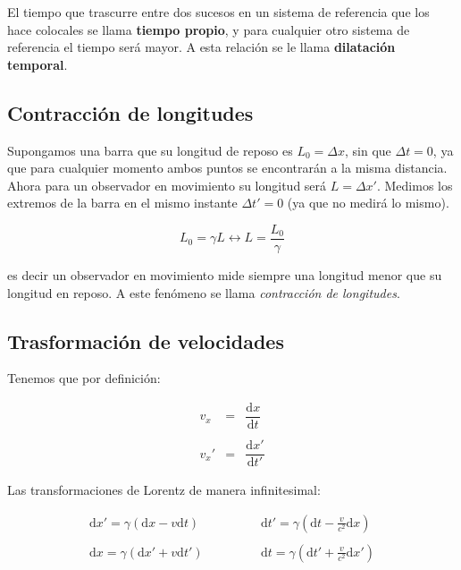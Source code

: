 \documentclass[12pt,a4paper]{book}
\newcommand{\D}{\mathrm{d}}
\newcommand{\tquad}{\quad \quad \quad}
\begin{document}
El tiempo que trascurre entre dos sucesos en un sistema de referencia que los hace colocales se llama \textbf{tiempo propio}, y para cualquier otro sistema de referencia el tiempo será mayor. A esta relación se le llama \textbf{dilatación temporal}.

\subsection{Contracción de longitudes}

Supongamos una barra que su longitud de reposo es $L_0 = \Delta x$, sin que $\Delta t = 0$, ya que para cualquier momento ambos puntos se encontrarán a la misma distancia. Ahora para un observador en movimiento su longitud será $L = \Delta x'$. Medimos los extremos de la barra en el mismo instante $\Delta t' = 0$ (ya que no medirá lo mismo). 

\begin{equation}
L_0 = \gamma L \longleftrightarrow L = \dfrac{L_0}{\gamma}
\end{equation}

es decir un observador en movimiento mide siempre una longitud menor que su longitud en reposo. A este fenómeno se llama \textit{contracción de longitudes}. 

\subsection{Trasformación de velocidades}

Tenemos que por definición:

\begin{equation}
\begin{array}{lll}
v_x & = & \dfrac{\D x}{\D t} \\ \\
v_x' & = & \dfrac{\D x'}{\D t'}
\end{array}
\label{Ec:4.1.6-012}
\end{equation}

Las transformaciones de Lorentz de manera infinitesimal:


\begin{equation}
\begin{array}{lll}
\D x' = \gamma (\D x - v \D t) & \tquad & \D t' = \gamma (\D t - \frac{v}{c^2} \D x) \\ \\
\D x = \gamma (\D x' + v \D t') & \tquad & \D t = \gamma (\D t' + \frac{v}{c^2} \D x') \\
\end{array} 
\end{equation}
\end{document}

